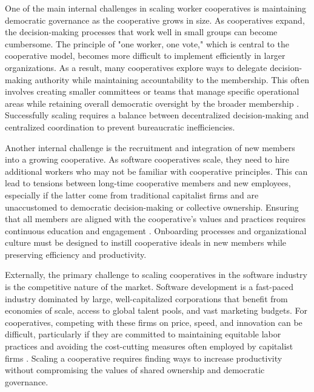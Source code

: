 \begin{refsection}
One of the main internal challenges in scaling worker cooperatives is maintaining democratic governance as the cooperative grows in size. As cooperatives expand, the decision-making processes that work well in small groups can become cumbersome. The principle of "one worker, one vote," which is central to the cooperative model, becomes more difficult to implement efficiently in larger organizations. As a result, many cooperatives explore ways to delegate decision-making authority while maintaining accountability to the membership. This often involves creating smaller committees or teams that manage specific operational areas while retaining overall democratic oversight by the broader membership \cite[pp.~105-107]{rothschild2009}. Successfully scaling requires a balance between decentralized decision-making and centralized coordination to prevent bureaucratic inefficiencies.

Another internal challenge is the recruitment and integration of new members into a growing cooperative. As software cooperatives scale, they need to hire additional workers who may not be familiar with cooperative principles. This can lead to tensions between long-time cooperative members and new employees, especially if the latter come from traditional capitalist firms and are unaccustomed to democratic decision-making or collective ownership. Ensuring that all members are aligned with the cooperative’s values and practices requires continuous education and engagement \cite[pp.~191-193]{vieta2020}. Onboarding processes and organizational culture must be designed to instill cooperative ideals in new members while preserving efficiency and productivity.

Externally, the primary challenge to scaling cooperatives in the software industry is the competitive nature of the market. Software development is a fast-paced industry dominated by large, well-capitalized corporations that benefit from economies of scale, access to global talent pools, and vast marketing budgets. For cooperatives, competing with these firms on price, speed, and innovation can be difficult, particularly if they are committed to maintaining equitable labor practices and avoiding the cost-cutting measures often employed by capitalist firms \cite[pp.~98-100]{restakis2012}. Scaling a cooperative requires finding ways to increase productivity without compromising the values of shared ownership and democratic governance.


\end{refsection}
